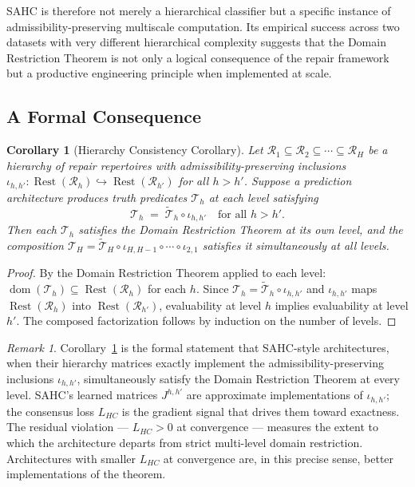 \documentclass[12pt, oneside]{article}
\theoremstyle{plain}
\newtheorem{corollary}[theorem]{Corollary}
\theoremstyle{definition}
\theoremstyle{remark}
\newtheorem{remark}[theorem]{Remark}
\DeclareMathOperator{\Rest}{Rest}
\newcommand{\iotamap}{\iota}        %
\begin{document}
SAHC is therefore not merely a hierarchical classifier
but a specific instance of admissibility-preserving multiscale
computation.
Its empirical success across two datasets with very different
hierarchical complexity suggests that the Domain Restriction
Theorem is not only a logical consequence of the repair
framework but a productive engineering principle when
implemented at scale.

\subsection{A Formal Consequence}

\begin{corollary}[Hierarchy Consistency Corollary]
  Let $\mathcal{R}_1 \subseteq \mathcal{R}_2 \subseteq \cdots
  \subseteq \mathcal{R}_H$ be a hierarchy of repair repertoires
  with admissibility-preserving inclusions
  $\iotamap_{h,h'}: \Rest(\mathcal{R}_h) \hookrightarrow
  \Rest(\mathcal{R}_{h'})$ for all $h > h'$.
  Suppose a prediction architecture produces truth predicates
  $\mathcal{T}_h$ at each level satisfying
  \[
    \mathcal{T}_h \;=\; \widetilde{\mathcal{T}}_h \circ \iotamap_{h,h'}
    \quad \text{for all } h > h'.
  \]
  Then each $\mathcal{T}_h$ satisfies the Domain Restriction Theorem
  at its own level, and the composition
  $\mathcal{T}_H = \widetilde{\mathcal{T}}_H \circ \iotamap_{H,H-1}
  \circ \cdots \circ \iotamap_{2,1}$
  satisfies it simultaneously at all levels.
  \label{cor:hierarchy-consistency}
\end{corollary}

\begin{proof}
  By the Domain Restriction Theorem applied to each level:
  $\operatorname{dom}(\mathcal{T}_h) \subseteq \Rest(\mathcal{R}_h)$
  for each $h$.
  Since $\mathcal{T}_h = \widetilde{\mathcal{T}}_h \circ \iotamap_{h,h'}$
  and $\iotamap_{h,h'}$ maps $\Rest(\mathcal{R}_h)$ into
  $\Rest(\mathcal{R}_{h'})$, evaluability at level $h$ implies
  evaluability at level $h'$.
  The composed factorization follows by induction on the
  number of levels.
\end{proof}

\begin{remark}
  Corollary~\ref{cor:hierarchy-consistency} is the formal
  statement that SAHC-style architectures, when their hierarchy
  matrices exactly implement the admissibility-preserving
  inclusions $\iotamap_{h,h'}$, simultaneously satisfy the
  Domain Restriction Theorem at every level.
  SAHC's learned matrices $J^{h,h'}$ are approximate
  implementations of $\iotamap_{h,h'}$; the consensus loss
  $L_{HC}$ is the gradient signal that drives them toward
  exactness.
  The residual violation --- $L_{HC} > 0$ at convergence
  --- measures the extent to which the architecture departs
  from strict multi-level domain restriction.
  Architectures with smaller $L_{HC}$ at convergence are, in
  this precise sense, better implementations of the theorem.
\end{remark}
\end{document}
